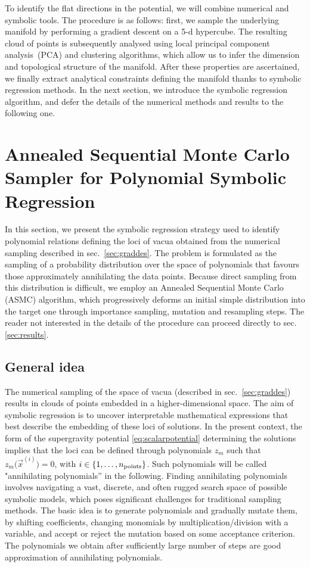 \documentclass[11pt,a4paper]{article}
\begin{document}
To identify the flat directions in the potential, we will combine numerical and symbolic tools. The procedure is as follows: first, we sample the underlying manifold by performing a gradient descent on a 5-d hypercube. The resulting cloud of points is subsequently analysed using local principal component analysis~(PCA) and clustering algorithms, which allow us to infer the dimension and topological structure of the manifold. After these properties are ascertained, we finally extract analytical constraints defining the manifold thanks to symbolic regression methods. In the next section, we introduce the symbolic regression algorithm, and defer the details of the numerical methods and results to the following one.

\section{Annealed Sequential Monte Carlo Sampler for Polynomial Symbolic Regression} \label{Sec:AIS-SMC}

	In this section, we present the symbolic regression strategy used to identify polynomial relations defining the loci of vacua obtained from the numerical sampling described in sec.~\ref{sec:graddes}. The problem is formulated as the sampling of a probability distribution over the space of polynomials that favours those approximately annihilating the data points. Because direct sampling from this distribution is difficult, we employ an Annealed Sequential Monte Carlo (ASMC) algorithm, which progressively deforms an initial simple distribution into the target one through importance sampling, mutation and resampling steps. The reader not interested in the details of the procedure can proceed directly to sec. \ref{sec:results}.

	\subsection{General idea}
	
	The numerical sampling of the space of vacua (described in sec.~\ref{sec:graddes}) results in clouds of points embedded in a higher-dimensional space. 
	The aim of symbolic regression is to uncover interpretable mathematical expressions that best describe the embedding of these loci of solutions. 
	In the present context, the form of the supergravity potential \eqref{eq:scalarpotential} determining the solutions implies that the loci can be defined through polynomials $z_{m}$ such that $z_{m}\big(\vec{x}^{(i)}\big) = 0$, with $i \in \{1, \dots, n_{\rm points}\}$. Such polynomials will be called "annihilating polynomials'' in the following.
	Finding annihilating polynomials involves navigating a vast, discrete, and often rugged search space of possible symbolic models, which poses significant challenges for traditional sampling methods. The basic idea is to generate polynomials and gradually mutate them, by shifting coefficients, changing monomials by multiplication/division with a variable, and accept or reject the mutation based on some acceptance criterion. The polynomials we obtain after sufficiently large number of steps are good approximation of annihilating polynomials. 
	
\end{document}
